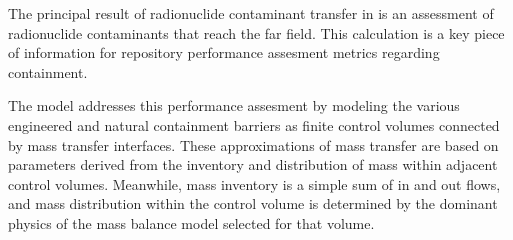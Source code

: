 The principal result of radionuclide contaminant transfer in \Cyder is an 
assessment of radionuclide contaminants that reach the far field. This 
calculation is a key piece of information for repository performance assesment 
metrics regarding containment.  

The \Cyder model addresses this performance assesment by modeling the various 
engineered and natural containment barriers as finite control volumes connected 
by mass transfer interfaces. These approximations of mass transfer are based on 
parameters derived from the inventory and distribution of mass within adjacent 
control volumes. Meanwhile, mass inventory is a simple sum of in and out flows, 
and mass distribution within the control volume is determined by the dominant 
physics of the mass balance model selected for that volume.

